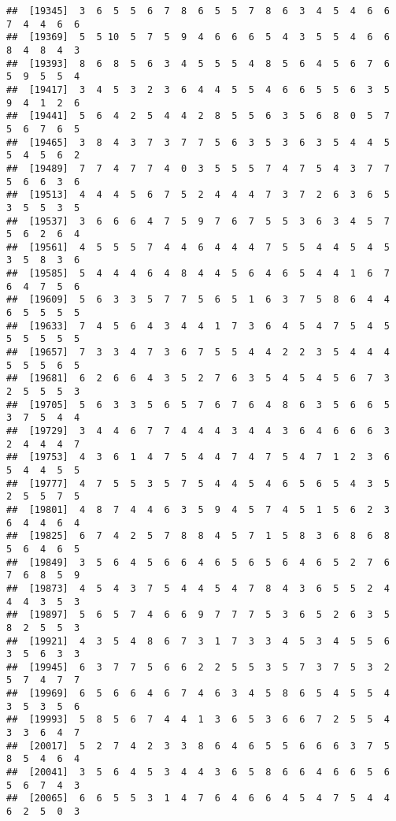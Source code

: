 \documentclass[
]{book}
\begin{document}
\begin{verbatim}
##  [19345]  3  6  5  5  6  7  8  6  5  5  7  8  6  3  4  5  4  6  6  7  4  4  6  6
##  [19369]  5  5 10  5  7  5  9  4  6  6  6  5  4  3  5  5  4  6  6  8  4  8  4  3
##  [19393]  8  6  8  5  6  3  4  5  5  5  4  8  5  6  4  5  6  7  6  5  9  5  5  4
##  [19417]  3  4  5  3  2  3  6  4  4  5  5  4  6  6  5  5  6  3  5  9  4  1  2  6
##  [19441]  5  6  4  2  5  4  4  2  8  5  5  6  3  5  6  8  0  5  7  5  6  7  6  5
##  [19465]  3  8  4  3  7  3  7  7  5  6  3  5  3  6  3  5  4  4  5  5  4  5  6  2
##  [19489]  7  7  4  7  7  4  0  3  5  5  5  7  4  7  5  4  3  7  7  5  6  6  3  6
##  [19513]  4  4  4  5  6  7  5  2  4  4  4  7  3  7  2  6  3  6  5  3  5  5  3  5
##  [19537]  3  6  6  6  4  7  5  9  7  6  7  5  5  3  6  3  4  5  7  5  6  2  6  4
##  [19561]  4  5  5  5  7  4  4  6  4  4  4  7  5  5  4  4  5  4  5  3  5  8  3  6
##  [19585]  5  4  4  4  6  4  8  4  4  5  6  4  6  5  4  4  1  6  7  6  4  7  5  6
##  [19609]  5  6  3  3  5  7  7  5  6  5  1  6  3  7  5  8  6  4  4  6  5  5  5  5
##  [19633]  7  4  5  6  4  3  4  4  1  7  3  6  4  5  4  7  5  4  5  5  5  5  5  5
##  [19657]  7  3  3  4  7  3  6  7  5  5  4  4  2  2  3  5  4  4  4  5  5  5  6  5
##  [19681]  6  2  6  6  4  3  5  2  7  6  3  5  4  5  4  5  6  7  3  2  5  5  5  3
##  [19705]  5  6  3  3  5  6  5  7  6  7  6  4  8  6  3  5  6  6  5  3  7  5  4  4
##  [19729]  3  4  4  6  7  7  4  4  4  3  4  4  3  6  4  6  6  6  3  2  4  4  4  7
##  [19753]  4  3  6  1  4  7  5  4  4  7  4  7  5  4  7  1  2  3  6  5  4  4  5  5
##  [19777]  4  7  5  5  3  5  7  5  4  4  5  4  6  5  6  5  4  3  5  2  5  5  7  5
##  [19801]  4  8  7  4  4  6  3  5  9  4  5  7  4  5  1  5  6  2  3  6  4  4  6  4
##  [19825]  6  7  4  2  5  7  8  8  4  5  7  1  5  8  3  6  8  6  8  5  6  4  6  5
##  [19849]  3  5  6  4  5  6  6  4  6  5  6  5  6  4  6  5  2  7  6  7  6  8  5  9
##  [19873]  4  5  4  3  7  5  4  4  5  4  7  8  4  3  6  5  5  2  4  4  4  3  5  3
##  [19897]  5  6  5  7  4  6  6  9  7  7  7  5  3  6  5  2  6  3  5  8  2  5  5  3
##  [19921]  4  3  5  4  8  6  7  3  1  7  3  3  4  5  3  4  5  5  6  3  5  6  3  3
##  [19945]  6  3  7  7  5  6  6  2  2  5  5  3  5  7  3  7  5  3  2  5  7  4  7  7
##  [19969]  6  5  6  6  4  6  7  4  6  3  4  5  8  6  5  4  5  5  4  3  5  3  5  6
##  [19993]  5  8  5  6  7  4  4  1  3  6  5  3  6  6  7  2  5  5  4  3  3  6  4  7
##  [20017]  5  2  7  4  2  3  3  8  6  4  6  5  5  6  6  6  3  7  5  8  5  4  6  4
##  [20041]  3  5  6  4  5  3  4  4  3  6  5  8  6  6  4  6  6  5  6  5  6  7  4  3
##  [20065]  6  6  5  5  3  1  4  7  6  4  6  6  4  5  4  7  5  4  4  6  2  5  0  3

\end{verbatim}
\end{document}
